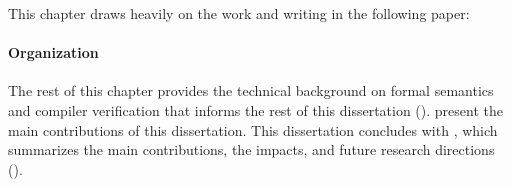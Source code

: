 
This chapter draws heavily on the work and writing in the following paper:



\paragraph{Organization}

The rest of this chapter provides the technical background on formal semantics and compiler
verification that informs the rest of this dissertation ().
 present the main contributions of this
dissertation.  This dissertation concludes with , which summarizes the main
contributions, the impacts, and future research directions ().






